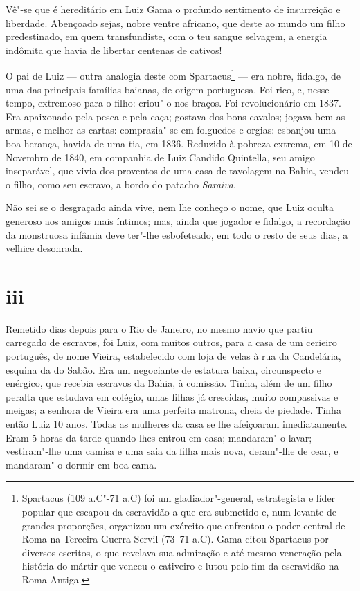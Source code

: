 Vê"-se que é hereditário em Luiz Gama o profundo sentimento de
insurreição e liberdade. Abençoado sejas, nobre ventre africano, que
deste ao mundo um filho predestinado, em quem transfundiste, com o teu
sangue selvagem, a energia indômita que havia de libertar centenas de
cativos!

O pai de Luiz --- outra analogia deste com Spartacus\footnote{
  Spartacus (109 a.C"-71 a.C) foi um gladiador"-general, estrategista e
  líder popular que escapou da escravidão a que era submetido e, num
  levante de grandes proporções, organizou um exército que enfrentou o
  poder central de Roma na Terceira Guerra Servil (73--71 a.C). Gama
  citou Spartacus por diversos escritos, o que revelava sua admiração e
  até mesmo veneração pela história do mártir que venceu o cativeiro e
  lutou pelo fim da escravidão na Roma Antiga.} --- era nobre, fidalgo,
de uma das principais famílias baianas, de origem portuguesa. Foi rico,
e, nesse tempo, extremoso para o filho: criou"-o nos braços. Foi
revolucionário em 1837. Era apaixonado pela pesca e pela caça; gostava
dos bons cavalos; jogava bem as armas, e melhor as cartas: comprazia"-se
em folguedos e orgias: esbanjou uma boa herança, havida de uma tia, em
1836. Reduzido à pobreza extrema, em 10 de Novembro de 1840, em
companhia de Luiz Candido Quintella, seu amigo inseparável, que vivia
dos proventos de uma casa de tavolagem na Bahia, vendeu o filho, como
seu escravo, a bordo do patacho \emph{Saraiva}.

Não sei se o desgraçado ainda vive, nem lhe conheço o nome, que Luiz
oculta generoso aos amigos mais íntimos; mas, ainda que jogador e
fidalgo, a recordação da monstruosa infâmia deve ter"-lhe esbofeteado, em
todo o resto de seus dias, a velhice desonrada.

\section*{iii}

Remetido dias depois para o Rio de Janeiro, no mesmo navio que partiu
carregado de escravos, foi Luiz, com muitos outros, para a casa de um
cerieiro português, de nome Vieira, estabelecido com loja de velas à rua
da Candelária, esquina da do Sabão. Era um negociante de estatura baixa,
circunspecto e enérgico, que recebia escravos da Bahia, à comissão.
Tinha, além de um filho peralta que estudava em colégio, umas filhas já
crescidas, muito compassivas e meigas; a senhora de Vieira era uma
perfeita matrona, cheia de piedade. Tinha então Luiz 10 anos. Todas as
mulheres da casa se lhe afeiçoaram imediatamente. Eram 5 horas da tarde
quando lhes entrou em casa; mandaram"-o lavar; vestiram"-lhe uma camisa e
uma saia da filha mais nova, deram"-lhe de cear, e mandaram"-o dormir em
boa cama.

